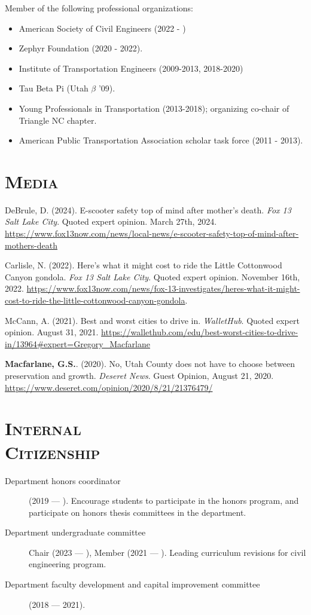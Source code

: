 \documentclass[margin,line]{res}
\newcommand{\secfont}{\scshape }
\begin{document}
\begin{resume}
Member of the following professional organizations:

\begin{itemize}
  \item American Society of Civil Engineers (2022 - )
  \item Zephyr Foundation (2020 - 2022).
  \item Institute of Transportation Engineers (2009-2013, 2018-2020)
  \item Tau Beta Pi (Utah $\beta$ '09).
  \item Young Professionals in Transportation (2013-2018); organizing co-chair of
Triangle NC chapter.
  \item American Public Transportation Association scholar task force (2011 - 2013).
\end{itemize}

\noindent\makebox[\linewidth]{\rule{\linewidth}{0.4pt}}

\section{\secfont Media}
DeBrule, D. (2024). E-scooter safety top of mind after mother's death. \textit{Fox 13 Salt Lake City}. Quoted expert opinion. March 27th, 2024. \url{https://www.fox13now.com/news/local-news/e-scooter-safety-top-of-mind-after-mothers-death}

Carlisle, N. (2022). Here’s what it might cost to ride the Little Cottonwood Canyon gondola. \textit{Fox 13 Salt Lake City}. Quoted expert opinion. November 16th, 2022. \url{https://www.fox13now.com/news/fox-13-investigates/heres-what-it-might-cost-to-ride-the-little-cottonwood-canyon-gondola}.

McCann, A. (2021). Best and worst cities to drive in. \textit{WalletHub}. Quoted expert opinion. August 31, 2021. \url{https://wallethub.com/edu/best-worst-cities-to-drive-in/13964#expert=Gregory_Macfarlane}

\textbf{Macfarlane, G.S.}. (2020). No, Utah County does not have to choose between preservation and growth. \textit{Deseret News}. Guest Opinion, August 21, 2020. \url{https://www.deseret.com/opinion/2020/8/21/21376479/}

\noindent\makebox[\linewidth]{\rule{\linewidth}{0.4pt}}
\section{\secfont Internal \\ Citizenship}
\begin{description}
  \item[Department honors coordinator] (2019 --- ). Encourage students to participate
  in the honors program, and participate on honors thesis committees in the
  department.
  \item[Department undergraduate committee] Chair (2023 --- ), Member (2021 --- ). Leading curriculum revisions for civil engineering program.
  \item[Department faculty development and capital improvement committee] (2018 --- 2021).
\end{description}



\end{resume}
\end{document}
